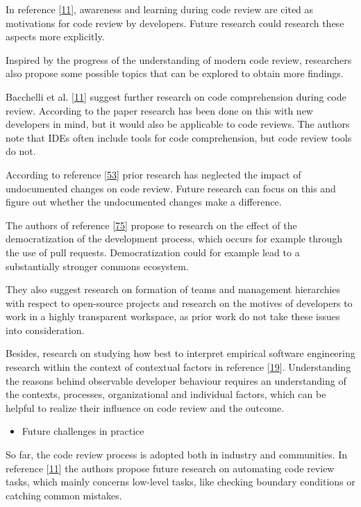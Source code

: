 \documentclass[]{book}
\providecommand{\tightlist}{%
  \setlength{\itemsep}{0pt}\setlength{\parskip}{0pt}}
\begin{document}
In reference
{[}\protect\hyperlink{ref-bacchelli2013expectations}{11}{]}, awareness
and learning during code review are cited as motivations for code review
by developers. Future research could research these aspects more
explicitly.

Inspired by the progress of the understanding of modern code review,
researchers also propose some possible topics that can be explored to
obtain more findings.

Bacchelli et al.
{[}\protect\hyperlink{ref-bacchelli2013expectations}{11}{]} suggest
further research on code comprehension during code review. According to
the paper research has been done on this with new developers in mind,
but it would also be applicable to code reviews. The authors note that
IDEs often include tools for code comprehension, but code review tools
do not.

According to reference
{[}\protect\hyperlink{ref-czerwonka2015code}{53}{]} prior research has
neglected the impact of undocumented changes on code review. Future
research can focus on this and figure out whether the undocumented
changes make a difference.

The authors of reference
{[}\protect\hyperlink{ref-gousios2014exploratory}{75}{]} propose to
research on the effect of the democratization of the development
process, which occurs for example through the use of pull requests.
Democratization could for example lead to a substantially stronger
commons ecosystem.

They also suggest research on formation of teams and management
hierarchies with respect to open-source projects and research on the
motives of developers to work in a highly transparent workspace, as
prior work do not take these issues into consideration.

Besides, research on studying how best to interpret empirical software
engineering research within the context of contextual factors in
reference {[}\protect\hyperlink{ref-baysal2013influence}{19}{]}.
Understanding the reasons behind observable developer behaviour requires
an understanding of the contexts, processes, organizational and
individual factors, which can be helpful to realize their influence on
code review and the outcome.

\begin{itemize}
\tightlist
\item
  Future challenges in practice
\end{itemize}

So far, the code review process is adopted both in industry and
communities. In reference
{[}\protect\hyperlink{ref-bacchelli2013expectations}{11}{]} the authors
propose future research on automating code review tasks, which mainly
concerns low-level tasks, like checking boundary conditions or catching
common mistakes.
\end{document}
